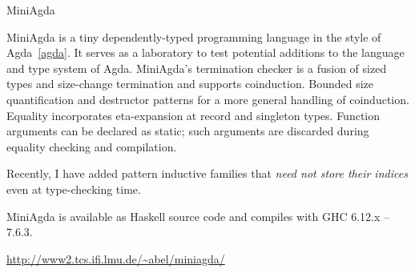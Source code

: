 \begin{hcarentry}{MiniAgda}
\makeheader

MiniAgda is a tiny dependently-typed programming language in the style
of Agda~\cref{agda}. It serves as a laboratory to test
potential additions to the
language and type system of Agda. MiniAgda's termination checker is a
fusion of sized types and size-change termination and supports
coinduction. Bounded size quantification and destructor
patterns for a more general handling of coinduction.
Equality incorporates eta-expansion at record and
singleton types. Function arguments can be declared as static; such
arguments are discarded during equality checking and compilation.

Recently, I have added pattern inductive families that \emph{need not store
their indices} even at type-checking time.

MiniAgda is available as Haskell source code and compiles with GHC
6.12.x -- 7.6.3.

\FurtherReading
  \url{http://www2.tcs.ifi.lmu.de/~abel/miniagda/}
\end{hcarentry}
